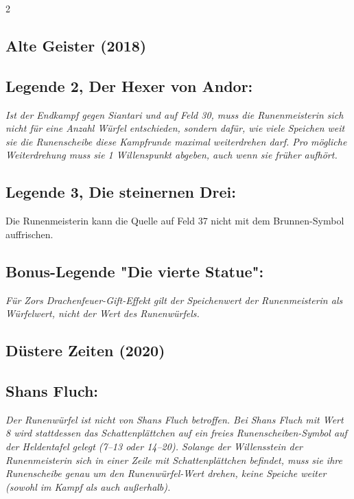 \documentclass[10pt, a4paper, oneside]{book}
\newcommand{\fan}[1]{\textit{#1}}
\begin{document}
\begin{multicols*}{2}
\begin{bgcolor}[color-AG]
\section{Alte Geister (2018)}



\subsection{Legende 2, Der Hexer von Andor:}

\fan{Ist der Endkampf gegen Siantari und auf Feld 30, muss die Runenmeisterin sich nicht für eine Anzahl Würfel entschieden, sondern dafür, wie viele Speichen weit sie die Runenscheibe diese Kampfrunde maximal weiterdrehen darf. Pro mögliche Weiterdrehung muss sie 1 Willenspunkt abgeben, auch wenn sie früher aufhört.}



\subsection{Legende 3, Die steinernen Drei:}

Die Runenmeisterin kann die Quelle auf Feld 37 nicht mit dem Brunnen-Symbol auffrischen.
\supercite{AG:Begleitheft,88563}




\subsection{Bonus-Legende "Die vierte Statue":}

\fan{Für Zors Drachenfeuer-Gift-Effekt gilt der Speichenwert der Runenmeisterin als Würfelwert, nicht der Wert des Runenwürfels.}

\end{bgcolor}





\begin{bgcolor}[color-DZ]
\section{Düstere Zeiten (2020)}

\subsection{Shans Fluch:}

\fan{Der Runenwürfel ist nicht von Shans Fluch betroffen. Bei Shans Fluch mit Wert 8 wird stattdessen das Schattenplättchen auf ein freies Runenscheiben-Symbol auf der Heldentafel gelegt (7–13 oder 14–20). Solange der Willensstein der Runenmeisterin sich in einer Zeile mit Schattenplättchen befindet, muss sie ihre Runenscheibe genau um den Runenwürfel-Wert drehen, keine Speiche weiter (sowohl im Kampf als auch außerhalb).}


\end{bgcolor}
\end{multicols*}
\end{document}

